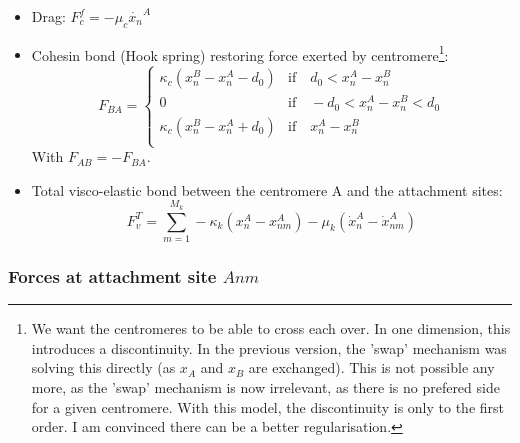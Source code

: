 \documentclass[a4paper,12pt]{article}
\begin{document}
\begin{itemize}
\item Drag: $F_c^f = -\mu_c \dot{x_n}^A$
\item Cohesin bond (Hook spring) restoring force exerted by
  centromere\footnote{We want the centromeres to be able to cross each
    over. In one dimension, this introduces a discontinuity. In the
    previous version, the 'swap' mechanism was solving this directly
    (as $x_A$ and $x_B$ are exchanged). This is not possible any more,
    as the 'swap' mechanism is now irrelevant, as there is no prefered
    side for a given centromere. With this model, the discontinuity is
    only to the first order. I am convinced there can be a better
    regularisation.}:
  \begin{equation}
    F_{BA} =
    \begin{cases}
      \kappa_c (x_n^B - x_n^A - d_0) &\mathrm{if}\quad d_0 < x_n^A - x_n^B\\
      0  &\mathrm{if}\quad - d_0 < x_n^A - x_n^B < d_0\\
      \kappa_c (x_n^B - x_n^A + d_0) &\mathrm{if}\quad  x_n^A - x_n^B\\
    \end{cases}
  \end{equation}
  With $F_{AB} = - F_{BA}$. 
\item Total visco-elastic bond between the centromere A and the attachment
  sites:
  $$ F_v^T = \sum_{m = 1}^{M_k} -\kappa_k(x_n^A - x_{nm}^A) 
  - \mu_k(\dot{x}_n^A - \dot{x}_{nm}^A) $$
\end{itemize}


\subsubsection{Forces at attachment site $Anm$}
\end{document}
